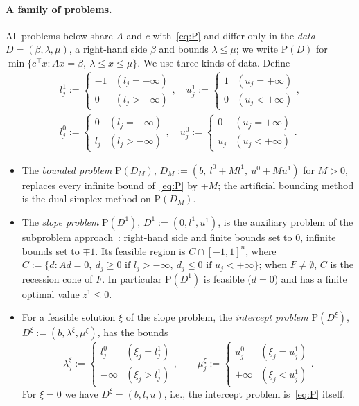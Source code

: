 \documentclass[11pt,a4paper]{article}
\theoremstyle{plain}
\theoremstyle{definition}
\theoremstyle{remark}
\newcommand{\Pb}{\mathrm{P}}
\begin{document}
\paragraph{A family of problems.}
All problems below share $A$ and $c$ with~\eqref{eq:P} and differ only in the \emph{data} $D=(\beta,\lambda,\mu)$, a right-hand side $\beta$ and bounds $\lambda\le\mu$; we write $\Pb(D)$ for $\min\{c^\top x: Ax=\beta,\ \lambda\le x\le\mu\}$. We use three kinds of data. Define
\begin{gather*}
  l_j^1:=\begin{cases}-1&(l_j=-\infty)\\0&(l_j>-\infty)\end{cases},\quad
  u_j^1:=\begin{cases}1&(u_j=+\infty)\\0&(u_j<+\infty)\end{cases},\\
  l_j^0:=\begin{cases}0&(l_j=-\infty)\\l_j&(l_j>-\infty)\end{cases},\quad
  u_j^0:=\begin{cases}0&(u_j=+\infty)\\u_j&(u_j<+\infty)\end{cases}.
\end{gather*}
\begin{itemize}
\item The \emph{bounded problem} $\Pb(D_M)$, $D_M:=(b,\ l^0+Ml^1,\ u^0+Mu^1)$ for $M>0$, replaces every infinite bound of~\eqref{eq:P} by $\mp M$; the artificial bounding method is the dual simplex method on $\Pb(D_M)$.
\item The \emph{slope problem} $\Pb(D^1)$, $D^1:=(0,l^1,u^1)$, is the auxiliary problem of the subproblem approach~\cite{fourer1994}: right-hand side and finite bounds set to $0$, infinite bounds set to $\mp1$. Its feasible region is $C\cap[-1,1]^n$, where $C:=\{d: Ad=0,\ d_j\ge0 \text{ if } l_j>-\infty,\ d_j\le0 \text{ if } u_j<+\infty\}$; when $F\neq\emptyset$, $C$ is the recession cone of $F$. In particular $\Pb(D^1)$ is feasible ($d=0$) and has a finite optimal value $z^1\le0$.
\item For a feasible solution $\xi$ of the slope problem, the \emph{intercept problem} $\Pb(D^\xi)$, $D^\xi:=(b,\lambda^\xi,\mu^\xi)$, has the bounds
\begin{equation}
  \lambda^\xi_j:=\begin{cases}l^0_j&(\xi_j=l^1_j)\\-\infty&(\xi_j>l^1_j)\end{cases},\qquad
  \mu^\xi_j:=\begin{cases}u^0_j&(\xi_j=u^1_j)\\+\infty&(\xi_j<u^1_j)\end{cases}.
  \label{eq:intercept}
\end{equation}
For $\xi=0$ we have $D^\xi=(b,l,u)$, i.e., the intercept problem is~\eqref{eq:P} itself.
\end{itemize}
\end{document}
